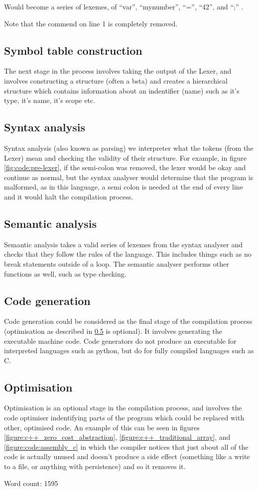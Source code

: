 \documentclass{article}
\begin{document}
Would become a series of lexemes, of ``var'', ``my\textunderscore number'', ``='', ``42'', and ``;'' \parencite{crafting_interpreters}.

Note that the commend on line 1 is completely removed.

\subsection{Symbol table construction}
The next stage in the process involves taking the output of the Lexer, and involves constructing a structure (often a \gls{bsta}) and creates a hierarchical structure which contains information about an indentifier (name) such as it's type, it's name, it's scope etc.
\subsection{Syntax analysis}
Syntax analysis (also known as parsing) we interpreter what the tokens (from the Lexer) mean and checking the validity of their structure. For example, in figure \ref{fig:code:pre-lexer}, if the semi-colon was removed, the lexer would be okay and continue as normal, but the syntax analyser would determine that the program is malformed, as in this language, a semi colon is needed at the end of every line and it would halt the compilation process.
\subsection{Semantic analysis}
Semantic analysis takes a valid series of lexemes from the syntax analyser and checks that they follow the rules of the language. This includes things such as no break statements outside of a loop. The semantic analyser performs other functions as well, such as type checking.

\subsection{Code generation}
Code generation could be considered as the final stage of the compilation process (optimisation as described in \ref{stages_of_compilation:optimisation} is optional). It involves generating the executable machine code. Code generators do not produce an executable for interpreted languages such as python, but do for fully compiled languages such as C.
\subsection{Optimisation}\label{stages_of_compilation:optimisation}
Optimisation is an optional stage in the compilation process, and involves the code optimiser indentifying parts of the program which could be replaced with other, optimised code. An example of this can be seen in figures \ref{figure:c++_zero_cost_abstraction}, \ref{figure:c++_traditional_array}, and \ref{figure:code:assembly_c} in which the compiler notices that just about all of the code is actually unused and doesn't produce a side effect (something like a write to a file, or anything with persistence) and so it removes it.
\newpage

\printbibliography[heading=none]

\printglossary[type=main]

Word count: 1595
\end{document}
